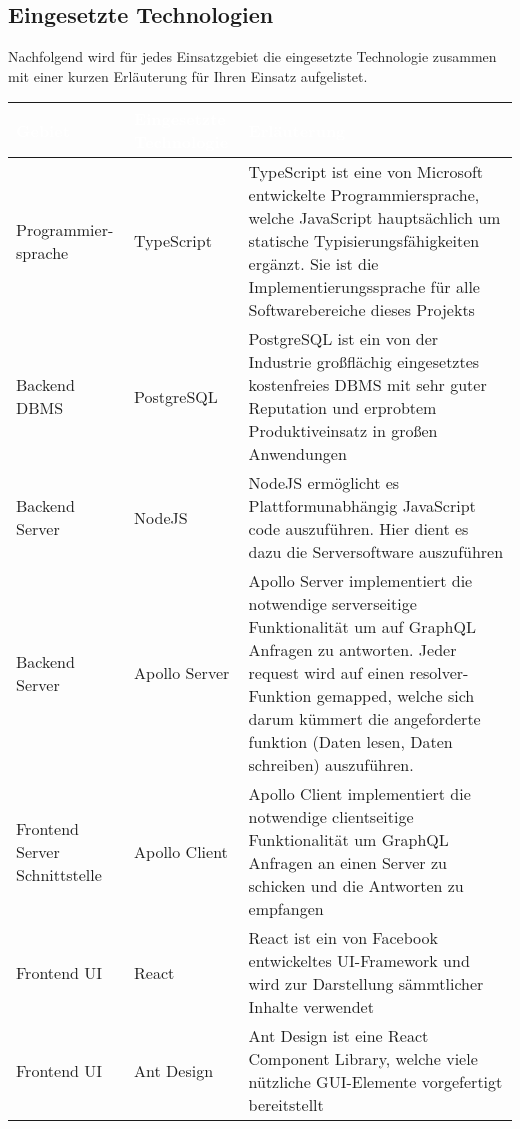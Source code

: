 \documentclass[a4paper,12pt]{article}
\begin{document}
\subsection{Eingesetzte Technologien}
Nachfolgend wird für jedes Einsatzgebiet die eingesetzte Technologie zusammen mit einer kurzen Erläuterung
für Ihren Einsatz aufgelistet.

\begin{center}
      \begin{tabular}{|m{3cm}|m{3cm}|m{9cm}|}
            \hline
        \rowcolor{TUMBlue} \textcolor{white}{\textbf{Gebiet}} & \textcolor{white}{\textbf{Eingesetzte Technologie}} & \textcolor{white}{\textbf{Erläuterung}} \\
        \hline
        Programmier- sprache & TypeScript & TypeScript ist eine von Microsoft entwickelte Programmiersprache, welche JavaScript hauptsächlich um statische Typisierungsfähigkeiten ergänzt. Sie ist die Implementierungssprache für alle Softwarebereiche dieses Projekts \\
        \hline
        Backend DBMS & PostgreSQL & PostgreSQL ist ein von der Industrie großflächig eingesetztes kostenfreies DBMS mit sehr guter Reputation und erprobtem Produktiveinsatz in großen Anwendungen \\
        \hline
        Backend Server & NodeJS & NodeJS ermöglicht es Plattformunabhängig JavaScript code auszuführen. Hier dient es dazu die Serversoftware auszuführen \\
        \hline
        Backend Server & Apollo Server & Apollo Server implementiert die notwendige serverseitige Funktionalität um auf GraphQL Anfragen zu antworten. Jeder request wird auf einen resolver-Funktion gemapped, welche sich darum kümmert die angeforderte funktion (Daten lesen, Daten schreiben) auszuführen. \\
        \hline
        Frontend Server Schnittstelle & Apollo Client & Apollo Client implementiert die notwendige clientseitige Funktionalität um GraphQL Anfragen an einen Server zu schicken und die Antworten zu empfangen \\
        \hline
        Frontend UI & React & React ist ein von Facebook entwickeltes UI-Framework und wird zur Darstellung sämmtlicher Inhalte verwendet \\
        \hline
        Frontend UI & Ant Design & Ant Design ist eine React Component Library, welche viele nützliche GUI-Elemente vorgefertigt bereitstellt \\
        \hline
      \end{tabular}
\end{center}
\end{document}
